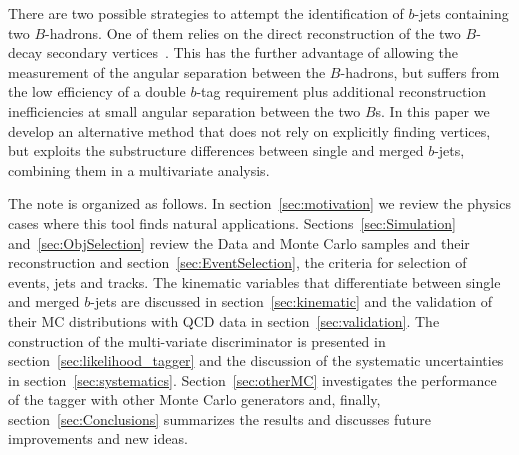There are two possible strategies to attempt the identification of $b$-jets containing two $B$-hadrons. One of them relies on the direct reconstruction of the two $B$-decay secondary vertices~\cite{CDFAzimutalCorrelation}. This has the further advantage of allowing the measurement of the angular separation between the $B$-hadrons, but suffers from the low efficiency of a double $b$-tag requirement plus additional reconstruction inefficiencies at small angular separation between the two $B$s. In this paper we develop an alternative method that does not rely on explicitly finding vertices, but exploits the substructure differences between single and merged $b$-jets, combining them in a multivariate analysis. 

The note is organized as follows. In section~\ref{sec:motivation} we review the physics cases where this tool finds natural applications. Sections~\ref{sec:Simulation} and~\ref{sec:ObjSelection} review the Data and Monte Carlo samples and their reconstruction and section~\ref{sec:EventSelection}, the criteria for selection of events, jets and tracks. The kinematic variables that differentiate between single and merged $b$-jets are discussed in section~\ref{sec:kinematic} and the validation of their MC distributions with QCD data in section~\ref{sec:validation}.  The construction of the multi-variate discriminator is presented in section~\ref{sec:likelihood_tagger} and the discussion of the systematic uncertainties in section~\ref{sec:systematics}. Section~\ref{sec:otherMC} investigates the performance of the tagger with other Monte Carlo generators and, finally, section~\ref{sec:Conclusions} summarizes the results and discusses future improvements and new ideas. %


